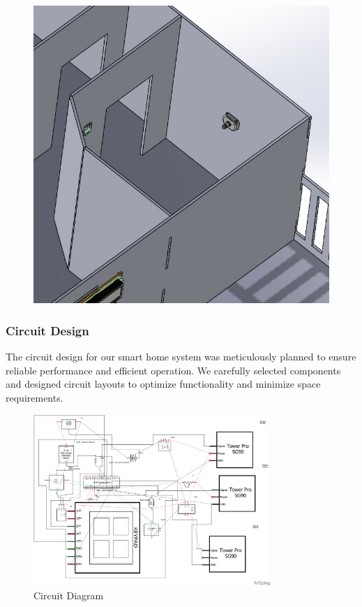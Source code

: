 \begin{figure}[htbp]
    \hfill
    \begin{minipage}[t]{0.2\textwidth}
        \centering
        \includegraphics[width=\textwidth]{figs/Smart_Home8.jpg}
    \end{minipage}
\end{figure}



\subsubsection{Circuit Design}
The circuit design for our smart home system was meticulously planned to ensure reliable performance and efficient operation. We carefully selected components and designed circuit layouts to optimize functionality and minimize space requirements.

\begin{figure}[htbp]
    \centering
    \includegraphics[width=0.8\textwidth]{figs/Smart_Home_Schema.png}
    \caption{Circuit Diagram}
    \label{fig:circuit_diagram}
\end{figure}

